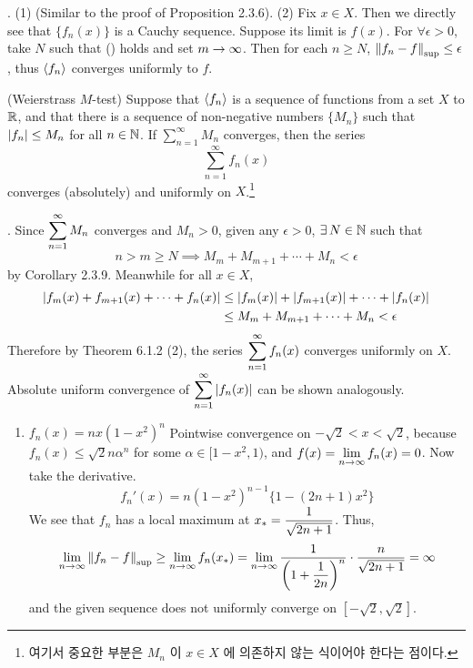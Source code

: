 \pf. (1) (Similar to the proof of Proposition 2.3.6).
\newline
(2) Fix \(x\in X\). Then we directly see that \(\{f_n(x)\}\) is a Cauchy sequence. Suppose its limit is \(f(x)\). For \(\forall \epsilon > 0\), take \(N\) such that (\textasteriskcentered) holds and set \(m\rightarrow \infty\). Then for each \(n \geq N\), \(\left\lVert f_n-f\right\rVert_{\sup} \leq \epsilon\), thus \(\left\langle f_n \right\rangle\) converges uniformly to \(f\).

 (Weierstrass \(M\)-test) Suppose that \(\left\langle f_n \right\rangle\) is a sequence of functions from a set \(X\) to \(\mathbb{R}\), and that there is a sequence of non-negative numbers \(\{M_n\}\) such that \(\left|f_n\right| \leq M_n\) for all \(n \in \mathbb{N}\). If \(\sum_{n=1}^{\infty} M_n\) converges, then the series
\[
	\sum_{n=1}^\infty f_n(x)
\]
converges (absolutely) and uniformly on \(X\).\footnote{여기서 중요한 부분은 \(M_n\) 이 \(x\in X\) 에 의존하지 않는 식이어야 한다는 점이다.}

\pf. Since \(\displaystyle \sum_{n=1}^\infty M_n\) converges and \(M_n > 0\), given any \(\epsilon>0\), \(\exists\,N\in \mathbb{N}\) such that 
\[
	n > m \geq N \implies M_m + M_{m+1} + \cdots + M_n < \epsilon
\]
by Corollary 2.3.9.
\newline
Meanwhile for all \(x \in X\),
\[
	\begin{aligned}
		\left|f_m(x) + f_{m+1}(x) + \cdots + f_n(x)\right| & \leq \left|f_m(x)\right| + \left|f_{m+1}(x)\right| + \cdots + \left|f_n(x)\right| \\
													& \leq M_m + M_{m+1} + \cdots + M_n < \epsilon
	\end{aligned}
\]
Therefore by Theorem 6.1.2 (2), the series \(\displaystyle \sum_{n=1}^\infty f_n(x)\) converges uniformly on \(X\).
\newline
Absolute uniform convergence of \(\displaystyle \sum_{n=1}^\infty \left|f_n(x)\right|\) can be shown analogously.

\begin{enumerate}
	\item \(f_n(x) = nx(1-x^2)^n\) \newline
	Pointwise convergence on \(-\sqrt{2} < x < \sqrt{2}\), because \(f_n(x) \leq \sqrt{2}n\alpha^n\) for some \(\alpha \in [1-x^2, 1)\), and \(f(x) = \displaystyle \lim_{n \rightarrow \infty} f_n(x) = 0\). Now take the derivative.
	\[
		f_n'(x) = n(1-x^2)^{n-1}\{1 - (2n+1)x^2\}
	\]
	We see that \(f_n\) has a local maximum at \(\displaystyle x_\ast = \frac{1}{\sqrt{2n+1}}\). Thus,
	\[
		\lim_{n\rightarrow\infty} \left\lVert f_n-f\right\rVert_{\sup} \geq \lim_{n \rightarrow \infty} f_n(x_\ast) = \lim_{n \rightarrow \infty} \frac{1}{\left(1 + \dfrac{1}{2n}\right)^n}\cdot \frac{n}{\sqrt{2n+1}} = \infty
	\]
	and the given sequence does not uniformly converge on \([-\sqrt{2}, \sqrt{2}]\).
\end{enumerate}
